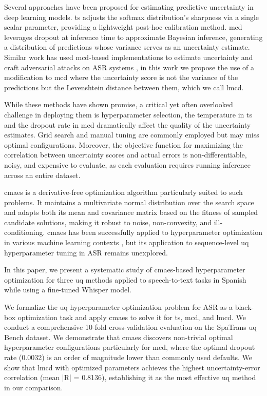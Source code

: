 \documentclass[11pt]{article}
\begin{document}
Several approaches have been proposed for estimating predictive uncertainty in deep learning models. \acrfull{ts} \cite{guo2017calibration} adjusts the softmax distribution's sharpness via a single scalar parameter, providing a lightweight post-hoc calibration method. \acrfull{mcd} \cite{gal2016dropout} leverages dropout at inference time to approximate Bayesian inference, generating a distribution of predictions whose variance serves as an uncertainty estimate. Similar work has used \acrshort{mcd}-based implementations to estimate uncertainty and craft adversarial attacks on ASR systems \cite{jayashankar2020detecting}, in this work we propose the use of a modification to \acrshort{mcd} where the uncertainty score is not the variance of the predictions but the Levenshtein distance between them, which we call \acrfull{lmcd}. 

While these methods have shown promise, a critical yet often overlooked challenge in deploying them is hyperparameter selection, the temperature in \acrshort{ts} and the dropout rate in \acrshort{mcd} dramatically affect the quality of the uncertainty estimates. Grid search and manual tuning are commonly employed but may miss optimal configurations. Moreover, the objective function for maximizing the correlation between uncertainty scores and actual errors is non-differentiable, noisy, and expensive to evaluate, as each evaluation requires running inference across an entire dataset.

\acrfull{cmaes} \cite{hansen2001completely} is a derivative-free optimization algorithm particularly suited to such problems. It maintains a multivariate normal distribution over the search space and adapts both its mean and covariance matrix based on the fitness of sampled candidate solutions, making it robust to noise, non-convexity, and ill-conditioning. \acrshort{cmaes} has been successfully applied to hyperparameter optimization in various machine learning contexts \cite{loshchilov2016cma}\cite{Feurer2019}, but its application to sequence-level \acrshort{uq} hyperparameter tuning in ASR remains unexplored.

In this paper, we present a systematic study of \acrshort{cmaes}-based hyperparameter optimization for three \acrshort{uq} methods applied to speech-to-text tasks in Spanish while using a fine-tuned Whisper model.

We formalize the \acrshort{uq} hyperparameter optimization problem for ASR as a black-box optimization task and apply \acrshort{cmaes} to solve it for \acrshort{ts}, \acrshort{mcd}, and \acrshort{lmcd}.
We conduct a comprehensive 10-fold cross-validation evaluation on the SpaTrans \acrshort{uq} Bench dataset.
We demonstrate that \acrshort{cmaes} discovers non-trivial optimal hyperparameter configurations particularly for \acrshort{mcd}, where the optimal dropout rate (0.0032) is an order of magnitude lower than commonly used defaults.
We show that \acrshort{lmcd} with optimized parameters achieves the highest uncertainty-error correlation (mean |R| = 0.8136), establishing it as the most effective \acrshort{uq} method in our comparison.
\end{document}
